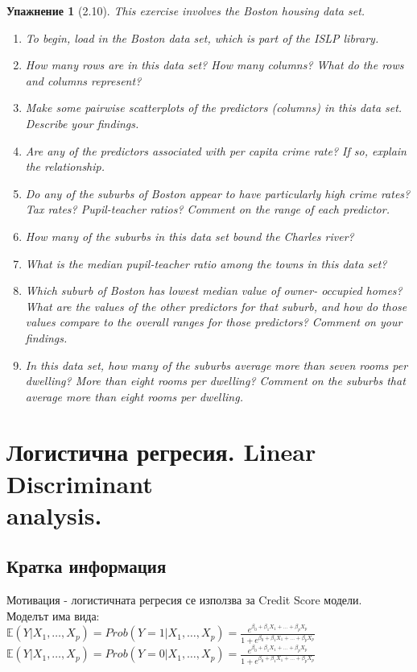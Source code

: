 \documentclass{article}
\newtheorem{exercise}[subsubsection]{Упажнение}
\begin{document}
	\begin{exercise}[2.10]
		This exercise involves the Boston housing data set.
		\begin{enumerate}[label=(\alph*)]
		\item To begin, load in the Boston data set, which is part of the ISLP
		library.
		\item How many rows are in this data set? How many columns? What
		do the rows and columns represent?
		\item Make some pairwise scatterplots of the predictors (columns) in
		this data set. Describe your findings.
		\item Are any of the predictors associated with per capita crime rate?
		If so, explain the relationship. 
		\item Do any of the suburbs of Boston appear to have particularly
		high crime rates? Tax rates? Pupil-teacher ratios? Comment on
		the range of each predictor.		 
		\item How many of the suburbs in this data set bound the Charles
		river?		 
		\item What is the median pupil-teacher ratio among the towns in this
		data set?		 
		\item Which suburb of Boston has lowest median value of owner-
		occupied homes? What are the values of the other predictors
		for that suburb, and how do those values compare to the overall
		ranges for those predictors? Comment on your findings.	 	 
		\item In this data set, how many of the suburbs average more than
		seven rooms per dwelling? More than eight rooms per dwelling?
		Comment on the suburbs that average more than eight rooms
		per dwelling.
		\end{enumerate}
	\end{exercise}
	
		
		
		
\newpage	
\section{Логистична регресия. Linear Discriminant \\ analysis.}




	\subsection{Кратка информация}
	Мотивация - логистичната регресия се използва за Credit Score модели.\\
	Моделът има вида: \\
	$\mathbb{E}(Y|X_1, \dots, X_p) = Prob(Y=1|X_1, \dots, X_p) = \frac{e^{\beta_0 + \beta_1 X_1 + \dots + \beta_p X_p}}{1+ e^{\beta_0 + \beta_1 X_1 + \dots + \beta_p X_p}} $ \\
	$\mathbb{E}(Y|X_1, \dots, X_p) = Prob(Y=0|X_1, \dots, X_p) = \frac{e^{\beta_0 + \beta_1 X_1 + \dots + \beta_p X_p}}{1+ e^{\beta_0 + \beta_1 X_1 + \dots + \beta_p X_p}} $
	
\end{document}
